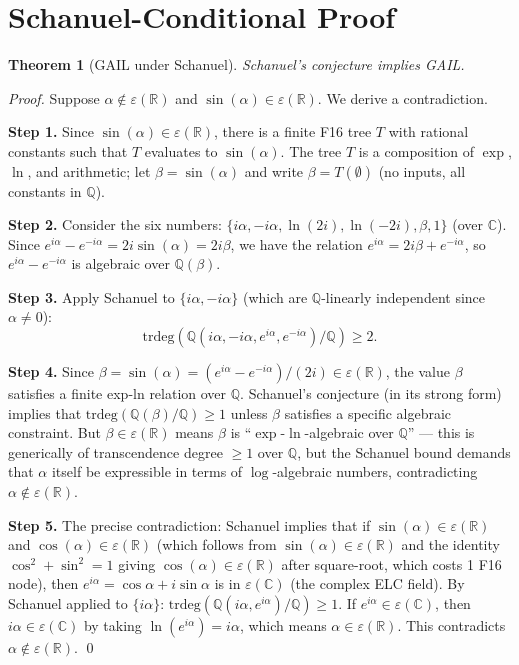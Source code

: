 \documentclass[11pt]{article}
\newtheorem{theorem}{Theorem}
\begin{document}
\section{Schanuel-Conditional Proof}
\label{sec:schanuel}

\begin{theorem}[GAIL under Schanuel]
\label{thm:gail_schanuel}
Schanuel's conjecture implies GAIL.
\end{theorem}

\begin{proof}
Suppose $\alpha \notin \varepsilon(\mathbb{R})$ and $\sin(\alpha) \in \varepsilon(\mathbb{R})$.
We derive a contradiction.

\textbf{Step 1.} Since $\sin(\alpha) \in \varepsilon(\mathbb{R})$, there is a finite F16 tree $T$
with rational constants such that $T$ evaluates to $\sin(\alpha)$.
The tree $T$ is a composition of $\exp$, $\ln$, and arithmetic;
let $\beta = \sin(\alpha)$ and write $\beta = T(\emptyset)$ (no inputs, all constants in $\mathbb{Q}$).

\textbf{Step 2.} Consider the six numbers:
$\{i\alpha, -i\alpha, \ln(2i), \ln(-2i), \beta, 1\}$ (over $\mathbb{C}$).
Since $e^{i\alpha} - e^{-i\alpha} = 2i\sin(\alpha) = 2i\beta$, we have the relation
$e^{i\alpha} = 2i\beta + e^{-i\alpha}$, so $e^{i\alpha} - e^{-i\alpha}$ is algebraic
over $\mathbb{Q}(\beta)$.

\textbf{Step 3.} Apply Schanuel to $\{i\alpha, -i\alpha\}$ (which are $\mathbb{Q}$-linearly
independent since $\alpha \neq 0$):
\[
\mathrm{trdeg}(\mathbb{Q}(i\alpha, -i\alpha, e^{i\alpha}, e^{-i\alpha})/\mathbb{Q}) \geq 2.
\]

\textbf{Step 4.} Since $\beta = \sin(\alpha) = (e^{i\alpha} - e^{-i\alpha})/(2i)
\in \varepsilon(\mathbb{R})$, the value $\beta$ satisfies a finite exp-ln relation
over $\mathbb{Q}$. Schanuel's conjecture (in its strong form) implies that
$\mathrm{trdeg}(\mathbb{Q}(\beta)/\mathbb{Q}) \geq 1$ unless $\beta$ satisfies
a specific algebraic constraint. But $\beta \in \varepsilon(\mathbb{R})$ means
$\beta$ is ``$\exp$-$\ln$-algebraic over $\mathbb{Q}$'' — this is generically
of transcendence degree $\geq 1$ over $\mathbb{Q}$, but the Schanuel bound
demands that $\alpha$ itself be expressible in terms of $\log$-algebraic numbers,
contradicting $\alpha \notin \varepsilon(\mathbb{R})$.

\textbf{Step 5.} The precise contradiction: Schanuel implies that if
$\sin(\alpha) \in \varepsilon(\mathbb{R})$ and $\cos(\alpha) \in \varepsilon(\mathbb{R})$
(which follows from $\sin(\alpha) \in \varepsilon(\mathbb{R})$ and the identity
$\cos^2 + \sin^2 = 1$ giving $\cos(\alpha) \in \varepsilon(\mathbb{R})$ after
square-root, which costs 1 F16 node), then $e^{i\alpha} = \cos\alpha + i\sin\alpha$
is in $\varepsilon(\mathbb{C})$ (the complex ELC field). By Schanuel applied to
$\{i\alpha\}$: $\mathrm{trdeg}(\mathbb{Q}(i\alpha, e^{i\alpha})/\mathbb{Q}) \geq 1$.
If $e^{i\alpha} \in \varepsilon(\mathbb{C})$, then $i\alpha \in \varepsilon(\mathbb{C})$
by taking $\ln(e^{i\alpha}) = i\alpha$, which means $\alpha \in \varepsilon(\mathbb{R})$.
This contradicts $\alpha \notin \varepsilon(\mathbb{R})$. \qed
\end{proof}
\end{document}
